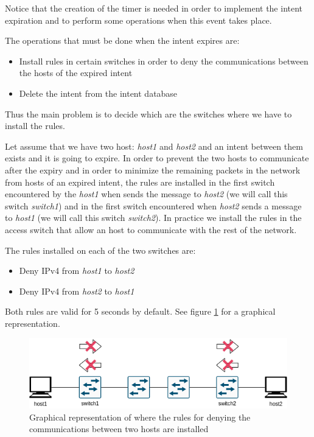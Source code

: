 \documentclass[a4paper]{report}
\begin{document}
\noindent Notice that the creation of the timer is needed in order to implement the intent expiration and to perform some operations when this event takes place.

\noindent The operations that must be done when the intent expires are:
\begin{itemize}
	\item Install rules in certain switches in order to deny the communications between the hosts of the expired intent
	\item Delete the intent from the intent database
\end{itemize}

\noindent Thus the main problem is to decide which are the switches where we have to install the rules.


\noindent Let assume that we have two host: \textit{host1} and \textit{host2} and an intent between them exists and it is going to expire. In order to prevent the two hosts to communicate after the expiry and in order to minimize the remaining packets in the network from hosts of an expired intent, the rules are installed in the first switch encountered by the \textit{host1} when sends the message to \textit{host2} (we will call this switch \textit{switch1}) and in the first switch encountered when \textit{host2} sends a message to \textit{host1} (we will call this switch \textit{switch2}). In practice we install the rules in the access switch that allow an host to communicate with the rest of the network.


\noindent The rules installed on each of the two switches are:
\begin{itemize}
	\item Deny IPv4 from \textit{host1} to \textit{host2}
	\item Deny IPv4 from \textit{host2} to \textit{host1}
\end{itemize}

\noindent Both rules are valid for 5 seconds by default. See figure \ref{img:switch12_example} for a graphical representation.

\begin{figure}[htp]
	\centering
	\includegraphics[width=0.7\linewidth]{img/example.png}
	\caption{Graphical representation of where the rules for denying the communications between two hosts are installed}
	\label{img:switch12_example}
\end{figure}
\end{document}
